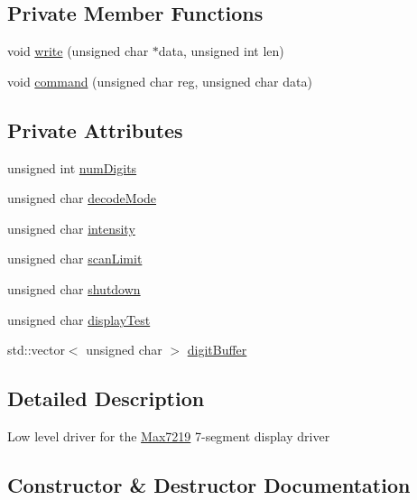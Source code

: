 \subsection*{Private Member Functions}
\begin{DoxyCompactItemize}
\item 
void \hyperlink{classdrumpi_1_1Max7219_aaf2f49b227cb65ead3ce0811714fe592}{write} (unsigned char $\ast$data, unsigned int len)
\item 
void \hyperlink{classdrumpi_1_1Max7219_a45fe4b7d187a021dca6c75ad7319ed6f}{command} (unsigned char reg, unsigned char data)
\end{DoxyCompactItemize}
\subsection*{Private Attributes}
\begin{DoxyCompactItemize}
\item 
unsigned int \hyperlink{classdrumpi_1_1Max7219_a71d7054477a82db272fb5c584576f25a}{num\+Digits}
\item 
unsigned char \hyperlink{classdrumpi_1_1Max7219_a7ba5a789cdd1120814595b89ba4e99e0}{decode\+Mode}
\item 
unsigned char \hyperlink{classdrumpi_1_1Max7219_a22aa789cc1ac84c6c5df7ad59607afed}{intensity}
\item 
unsigned char \hyperlink{classdrumpi_1_1Max7219_a605af97de38c0f8fd581ba17e6ce4f37}{scan\+Limit}
\item 
unsigned char \hyperlink{classdrumpi_1_1Max7219_a0b1b2c31442fe9a3a1db3cdae5dd32e8}{shutdown}
\item 
unsigned char \hyperlink{classdrumpi_1_1Max7219_a203552d0f41ceb1366dbd8bbf1608110}{display\+Test}
\item 
std\+::vector$<$ unsigned char $>$ \hyperlink{classdrumpi_1_1Max7219_ab26f32728dd82c00e39b6212436f291e}{digit\+Buffer}
\end{DoxyCompactItemize}


\subsection{Detailed Description}
Low level driver for the \hyperlink{classdrumpi_1_1Max7219}{Max7219} 7-\/segment display driver 

\subsection{Constructor \& Destructor Documentation}
\mbox{\label{classdrumpi_1_1Max7219_abc709f2a3b36fb872c560398b980aeb6}} 

